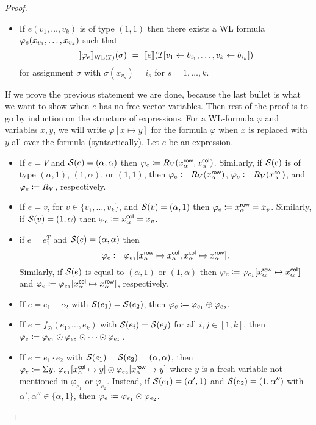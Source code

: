 \begin{proof}
\begin{itemize}
	\item If $e(v_1,\ldots,v_k)$ is of type $(1,1)$ then there exists a WL formula $\varphi_e( x_{v_1}, \ldots, x_{v_k})$ such that
	$$
	\ssem{\varphie}{\text{WL}(\I)}(\sigma) \ = \ \sem{e}{\I[v_1\gets b_{i_1},\ldots,v_k\gets b_{i_k}]}
	$$
	for assignment $\sigma$ with $\sigma(x_{v_s})=i_s$ for $s=1,\ldots, k$.
\end{itemize}
If we prove the previous statement we are done, because the last bullet is what we want to show when $e$ has no free vector variables. 
Then rest of the proof is to go by induction on the structure of \langprod expressions.
For a WL-formula $\varphi$ and variables $x,y$, we will write  $\varphi[x \mapsto y]$ for the formula $\varphi$ when $x$ is replaced with $y$ all over the formula (syntactically).
Let $e$ be an \langprod expression.
\begin{itemize} \itemsep3mm
  \item If $e=V$ and $\mathcal{S}(e)= (\alpha, \alpha)$ then $\varphi_e\coloneqq R_V(x_{\alpha}^{\mathsf{row}}, x_{\alpha}^{\mathsf{col}})$. Similarly, if $\mathcal{S}(e)$ is of type $(\alpha,1)$, $(1, \alpha)$, or $(1,1)$, then $\varphi_e\coloneqq R_V(x_{\alpha}^{\mathsf{row}})$, $\varphi_e\coloneqq R_V(x_{\alpha}^{\mathsf{col}})$, and $\varphi_e\coloneqq R_V$, respectively.
  
  \item If $e=v$, for $v\in \{v_1,\ldots ,v_k\}$, and $\mathcal{S}(v)= (\alpha,1)$ then $\varphi_e \coloneqq  x_{\alpha}^{\mathsf{row}} = x_v$. Similarly, if $\mathcal{S}(v)= (1,\alpha)$ then $\varphi_e \coloneqq  x_{\alpha}^{\mathsf{col}} = x_v$.
  
  \item if $e= e_1^T$ and $\mathcal{S}(e)=(\alpha,\alpha)$ then
  $$
  \varphi_e\coloneqq  \varphi_{e_1}[x_{\alpha}^{\mathsf{row}} \mapsto x_{\alpha}^{\mathsf{col}}, x_{\alpha}^{\mathsf{col}} \mapsto x_{\alpha}^{\mathsf{row}}].
  $$
  Similarly, if $\mathcal{S}(e)$ is equal to $(\alpha,1)$ or $(1,\alpha)$ then $\varphi_e\coloneqq \varphi_{e_1}[x_{\alpha}^{\mathsf{row}} \mapsto x_{\alpha}^{\mathsf{col}}]$ and $\varphi_e\coloneqq \varphi_{e_1}[x_{\alpha}^{\mathsf{col}} \mapsto x_{\alpha}^{\mathsf{row}}]$, respectively.   


	\item If $e=e_1+e_2$ with $\mathcal{S} (e_1)=\mathcal{S} (e_2)$, then $\varphi_e\coloneqq  \varphi_{e_1} \oplus \varphi_{e_2}$.
	
	\item If $e=f_\odot(e_1,\ldots, e_k)$ with $\mathcal{S}(e_i)=\mathcal{S}(e_j)$ for all $i,j\in[1,k]$, then $\varphi_e\coloneqq  \varphi_{e_1} \odot \varphi_{e_2} \odot \cdots \odot \varphi_{e_k}$.
	
	\item If $e=e_1\cdot e_2$ with $\mathcal{S} (e_1)=\mathcal{S} (e_2)=(\alpha, \alpha)$,  then $\varphi_e\coloneqq  \Sigma y. \  \varphi_{e_1}[x_{\alpha}^{\mathsf{col}} \mapsto y] \odot \varphi_{e_2}[x_{\alpha}^{\mathsf{row}} \mapsto y]$ where $y$ is a fresh variable not mentioned in $\varphi_{e_1}$ or $\varphi_{e_2}$. Instead, if $\mathcal{S} (e_1)= (\alpha', 1)$ and $\mathcal{S} (e_2)=(1, \alpha'')$ with $\alpha', \alpha'' \in \{\alpha, 1\}$, then $\varphi_e \coloneqq  \varphi_{e_1} \odot \varphi_{e_2}$.
	

\end{itemize}
\end{proof}
